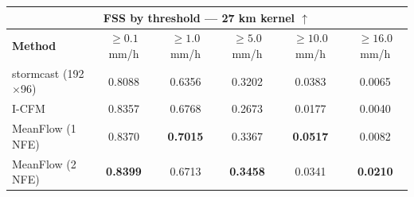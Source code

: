 \documentclass[border=10pt]{standalone}
\begin{document}
\begin{tabular}{lccccc}
\toprule
\multicolumn{6}{c}{\textbf{FSS by threshold — 27 km kernel} $\uparrow$} \\
\midrule
\textbf{Method} & $\geq 0.1$ mm/h & $\geq 1.0$ mm/h & $\geq 5.0$ mm/h & $\geq 10.0$ mm/h & $\geq 16.0$ mm/h \\
\midrule
stormcast (192$\times$96) & 0.8088 & 0.6356 & 0.3202 & 0.0383 & 0.0065 \\
I-CFM & 0.8357 & 0.6768 & 0.2673 & 0.0177 & 0.0040 \\
MeanFlow (1 NFE) & 0.8370 & \textbf{0.7015} & 0.3367 & \textbf{0.0517} & 0.0082 \\
MeanFlow (2 NFE) & \textbf{0.8399} & 0.6713 & \textbf{0.3458} & 0.0341 & \textbf{0.0210} \\
\bottomrule
\end{tabular}
\end{document}
